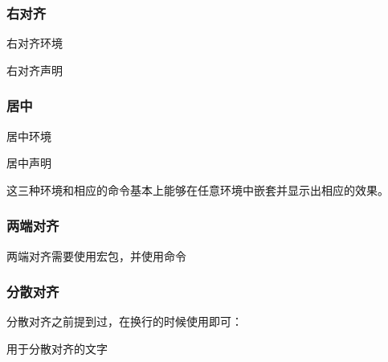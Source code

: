     \subsubsection{右对齐}
    \begin{texshow}
        \begin{flushright}
            右对齐环境
        \end{flushright}        
        \raggedleft 右对齐声明
    \end{texshow}
    \subsubsection{居中}
    \begin{texshow}
        \begin{center}
            居中环境
        \end{center}        
        \centering 居中声明
    \end{texshow}
    这三种环境和相应的命令基本上能够在任意环境中嵌套并显示出相应的效果。

    \subsubsection{两端对齐}
    两端对齐需要使用宏包，并使用命令
    
    

    \subsubsection{分散对齐}
    分散对齐之前提到过，在换行的时候使用即可：
    \begin{texshow}
        用于分散对齐的文字\linebreak
    \end{texshow}
